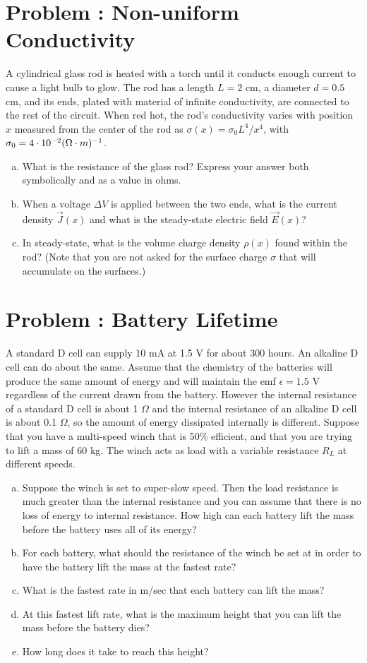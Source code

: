 \documentclass[problems]{esg8022pset}
\begin{document}
\section{Problem \thesection: Non-uniform Conductivity}
  A cylindrical glass rod is heated with a torch until it conducts enough current to cause a light bulb to glow. The rod has a length $L = 2$ cm, a diameter $d = 0.5$ cm, and its ends, plated with material of infinite conductivity, are connected to the rest of the circuit. When red hot, the rod's conductivity varies with position $x$ measured from the center of the rod as $\sigma(x) = \sigma_0 L^4 / x^4$, with $\sigma_0 = 4 \cdot 10^{-2} (\Omega\cdot{\rm m})^{-1}$.
  \begin{enumerate}[(a)]
    \item What is the resistance of the glass rod? Express your answer both symbolically and as a value in ohms.
    \item When a voltage $\Delta V$ is applied between the two ends, what is the current density $\vec J(x)$ and what is the steady-state electric field $\vec E(x)$?
    \item In steady-state, what is the volume charge density $\rho(x)$ found within the rod? (Note that you are not asked for the surface charge $\sigma$ that will accumulate on the surfaces.)
  \end{enumerate}
\section{Problem \thesection: Battery Lifetime}
  A standard D cell can supply 10 mA at 1.5 V for about 300 hours. An alkaline D cell can do about the same. Assume that the chemistry of the batteries will produce the same amount of energy and will maintain the emf $\epsilon = 1.5$ V regardless of the current drawn from the battery. However the internal resistance of a standard D cell is about 1 $\Omega$ and the internal resistance of an alkaline D cell is about 0.1 $\Omega$, so the amount of energy dissipated internally is different. Suppose that you have a multi-speed winch that is 50\% efficient, and that you are trying to lift a mass of 60 kg. The winch acts as load with a variable resistance $R_L$ at different speeds.
  \begin{enumerate}[(a)]
    \item Suppose the winch is set to super-slow speed. Then the load resistance is much greater than the internal resistance and you can assume that there is no loss of energy to internal resistance. How high can each battery lift the mass before the battery uses all of its energy?
    \item For each battery, what should the resistance of the winch be set at in order to have the battery lift the mass at the fastest rate?
    \item What is the fastest rate in m/sec that each battery can lift the mass?
    \item At this fastest lift rate, what is the maximum height that you can lift the mass before the battery dies?
    \item How long does it take to reach this height?
  \end{enumerate}
\end{document}
